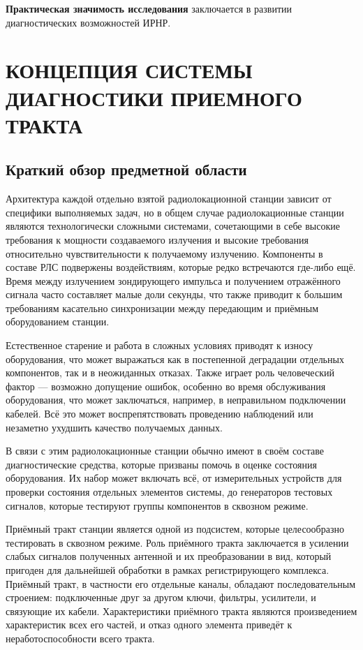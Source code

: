 \documentclass{report}
\begin{document}
{\bf Практическая значимость исследования} заключается в развитии диагностических возможностей ИРНР.

% 
\setcounter{section}{0} %
\setcounter{subsection}{0} %
\setcounter{equation}{0} %

\chapter{КОНЦЕПЦИЯ СИСТЕМЫ ДИАГНОСТИКИ ПРИЕМНОГО ТРАКТА}

\section{Краткий обзор предметной области}

Архитектура каждой отдельно взятой радиолокационной станции зависит от специфики выполняемых задач, но в общем случае радиолокационные станции являются технологически сложными системами, сочетающими в себе высокие требования к мощности создаваемого излучения и высокие требования относительно чувствительности к получаемому излучению. Компоненты в составе РЛС подвержены воздействиям, которые редко встречаются где-либо ещё. Время между излучением зондирующего импульса и получением отражённого сигнала часто составляет малые доли секунды, что также приводит к большим требованиям касательно синхронизации между передающим и приёмным оборудованием станции.

Естественное старение и работа в сложных условиях приводят к износу оборудования, что может выражаться как в постепенной деградации отдельных компонентов, так и в неожиданных отказах. Также играет роль человеческий фактор --- возможно допущение ошибок, особенно во время обслуживания оборудования, что может заключаться, например, в неправильном подключении кабелей. Всё это может воспрепятствовать проведению наблюдений или незаметно ухудшить качество получаемых данных.

В связи с этим радиолокационные станции обычно имеют в своём составе диагностические средства, которые призваны помочь в оценке состояния оборудования. Их набор может включать всё, от измерительных устройств для проверки состояния отдельных элементов системы, до генераторов тестовых сигналов, которые тестируют группы компонентов в сквозном режиме.

Приёмный тракт станции является одной из подсистем, которые целесообразно тестировать в сквозном режиме. Роль приёмного тракта заключается в усилении слабых сигналов полученных антенной и их преобразовании в вид, который пригоден для дальнейшей обработки в рамках регистрирующего комплекса. Приёмный тракт, в частности его отдельные каналы, обладают последовательным строением: подключенные друг за другом ключи, фильтры, усилители, и связующие их кабели. Характеристики приёмного тракта являются произведением характеристик всех его частей, и отказ одного элемента приведёт к неработоспособности всего тракта.
\end{document}
